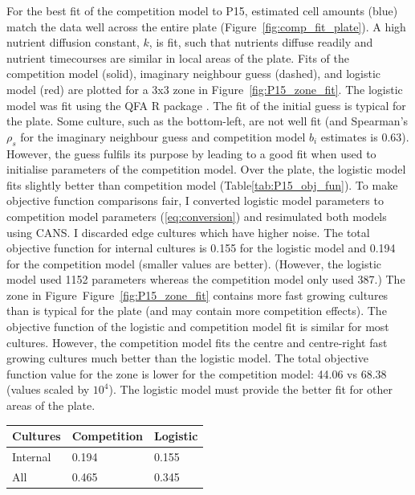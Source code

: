 For the best fit of the competition model to P15, estimated cell
amounts (blue) match the data well across the entire plate
(Figure~\ref{fig:comp_fit_plate}). A high nutrient diffusion constant,
\(k\), is fit, such that nutrients diffuse readily and nutrient
timecourses are similar in local areas of the plate. Fits of the
competition model (solid), imaginary neighbour guess (dashed), and
logistic model (red) are plotted for a 3x3 zone in
Figure~\ref{fig:P15_zone_fit}. The logistic model was fit using the
QFA R package \citep{qfa2016}. The fit of the initial guess is typical
for the plate. Some culture, such as the bottom-left, are not well fit
(and Spearman's \(\rho_{s}\) for the imaginary neighbour guess and
competition model \(b_{i}\) estimates is 0.63). However, the guess
fulfils its purpose by leading to a good fit when used to initialise
parameters of the competition model. Over the plate, the logistic
model fits slightly better than competition model
(Table\ref{tab:P15_obj_fun}). To make objective function comparisons
fair, I converted logistic model parameters to competition model
parameters (\ref{eq:conversion}) and resimulated both models using
CANS. I discarded edge cultures which have higher noise. The total
objective function for internal cultures is 0.155 for the logistic
model and 0.194 for the competition model (smaller values are
better). (However, the logistic model used 1152 parameters whereas the
competition model only used 387.) The zone in
Figure~Figure~\ref{fig:P15_zone_fit} contains more fast growing
cultures than is typical for the plate (and may contain more
competition effects). The objective function of the logistic and
competition model fit is similar for most cultures. However, the
competition model fits the centre and centre-right fast growing
cultures much better than the logistic model. The total objective
function value for the zone is lower for the competition model: 44.06
vs 68.38 (values scaled by \(10^{4}\)). The logistic model must
provide the better fit for other areas of the plate.

\begin{center}
  \begin{tabular}{l l l}
    \hline
    Cultures     & Competition & Logistic \\
    \hline
    Internal     & 0.194    & 0.155\\
    All          & 0.465    & 0.345\\
    \hline
  \end{tabular}
  \label{tab:P15_obj_fun}
\end{center}

